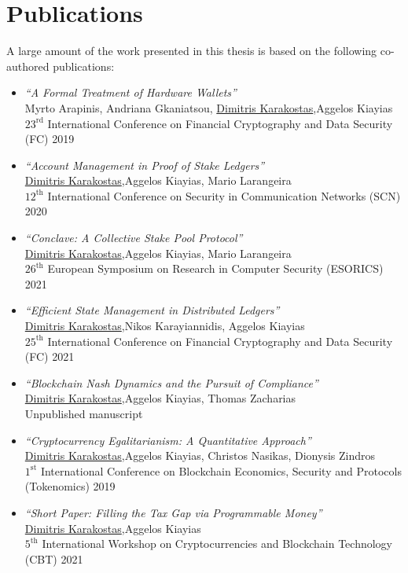 \section{Publications}

A large amount of the work presented in this thesis is based on the following
co-authored publications:
\begin{itemize}
    \item
        \emph{``A Formal Treatment of Hardware Wallets''}~\cite{FC:AGKK19}\\
        Myrto Arapinis, Andriana Gkaniatsou, \underline{Dimitris Karakostas},\footnotemark[1] Aggelos Kiayias\\
        $23^\text{rd}$ International Conference on Financial Cryptography and Data Security (FC) 2019
    \item
        \emph{``Account Management in Proof of Stake Ledgers''}~\cite{SCN:KarKiaLar20}\\
        \underline{Dimitris Karakostas},\footnotemark[1] Aggelos Kiayias, Mario Larangeira\\
        $12^\text{th}$ International Conference on Security in Communication Networks (SCN) 2020
    \item
        \emph{``Conclave: A Collective Stake Pool Protocol''}~\cite{karakostas2021conclave}\\
        \underline{Dimitris Karakostas},\footnotemark[1] Aggelos Kiayias, Mario Larangeira\\
        $26^\text{th}$ European Symposium on Research in Computer Security (ESORICS) 2021
    \item
        \emph{``Efficient State Management in Distributed Ledgers''}~\cite{karakostas2021efficient}\\
        \underline{Dimitris Karakostas},\footnotemark[1] Nikos Karayiannidis, Aggelos Kiayias\\
        $25^\text{th}$ International Conference on Financial Cryptography and Data Security (FC) 2021
    \item
        \emph{``Blockchain Nash Dynamics and the Pursuit of Compliance''}~\cite{karakostas2022blockchain}\\
        \underline{Dimitris Karakostas},\footnotemark[1] Aggelos Kiayias, Thomas Zacharias\\
        Unpublished manuscript
    \item
        \emph{``Cryptocurrency Egalitarianism: A Quantitative Approach''}~\cite{karakostas2019cryptocurrency}\\
        \underline{Dimitris Karakostas},\footnotemark[1] Aggelos Kiayias, Christos Nasikas, Dionysis Zindros\\
        $1^\text{st}$ International Conference on Blockchain Economics, Security and Protocols (Tokenomics) 2019
    \item
        \emph{``Short Paper: Filling the Tax Gap via Programmable Money''}~\cite{karakostas2021filling}\\
        \underline{Dimitris Karakostas},\footnotemark[1] Aggelos Kiayias\\
        $5^\text{th}$ International Workshop on Cryptocurrencies and Blockchain Technology (CBT) 2021
\end{itemize}
